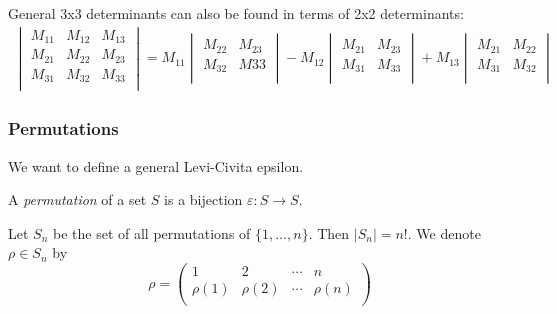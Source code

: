 \documentclass{../../template/note}
\begin{document}
    \begin{remark*}
        General 3x3 determinants can also be found in terms of 2x2 determinants:
        \begin{align*}
            \begin{vmatrix}
            M_{11} & M_{12} & M_{13} \\
            M_{21} & M_{22} & M_{23} \\
            M_{31} & M_{32} & M_{33} \\
            \end{vmatrix} = M_{11} \begin{vmatrix}
             M_{22} & M_{23} \\
             M_{32} & M{33} \\
            \end{vmatrix} - M_{12} \begin{vmatrix}
             M_{21} & M_{23} \\
             M_{31} & M_{33} \\
            \end{vmatrix} + M_{13} \begin{vmatrix}
             M_{21} & M_{22} \\
             M_{31} & M_{32} \\
            \end{vmatrix}
        \end{align*}
    \end{remark*}
    
    \subsubsection{Permutations}

    We want to define a general Levi-Civita epsilon.

    \begin{definition}
        A \emph{permutation} of a set \(S\) is a bijection \(\varepsilon: S \to S\).
    \end{definition}
    
    \begin{definition}
        Let \(S_n\) be the set of all permutations of \(\{1, \dots, n\}\). Then \(|S_n| = n!\). We denote \(\rho \in S_n\) by
        \[
            \rho = \begin{pmatrix}
             1 & 2 & \cdots & n \\
             \rho(1) & \rho(2) & \cdots & \rho(n) \\
            \end{pmatrix}
        \]
    \end{definition}
    
\end{document}
